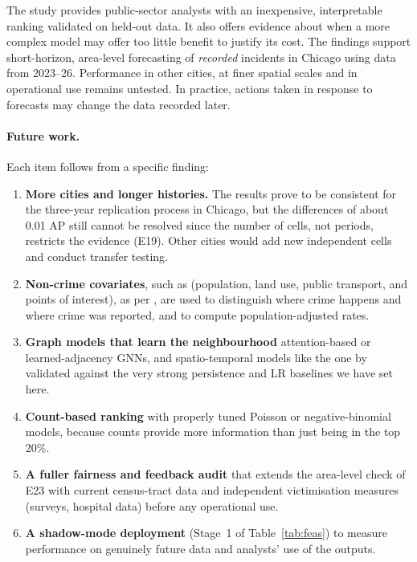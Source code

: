 \documentclass[11pt,a4paper]{report}
\begin{document}
The study provides public-sector analysts with an inexpensive, interpretable ranking validated on held-out data. It also offers evidence about when a more complex model may offer too little benefit to justify its cost. The findings support short-horizon, area-level forecasting of \emph{recorded} incidents in Chicago using data from 2023--26. Performance in other cities, at finer spatial scales and in operational use remains untested. In practice, actions taken in response to forecasts may change the data recorded later.


\paragraph{Future work.} Each item follows from a specific finding:
\begin{enumerate}
\item \textbf{More cities and longer histories.} The results prove to be consistent for the three-year replication process in Chicago, but the differences of about 0.01 AP still cannot be resolved since the number of cells, not periods, restricts the evidence (E19). Other cities would add new independent cells and conduct transfer testing.
\item \textbf{Non-crime covariates}, such as (population, land use, public transport, and points of interest), as per \citet{zhang2020}, are used to distinguish where crime happens and where crime was reported, and to compute population-adjusted rates.
\item \textbf{Graph models that learn the neighbourhood} attention-based or learned-adjacency GNNs, and spatio-temporal models like the one by \citet{han2020} validated against the very strong persistence and LR baselines we have set here.
\item \textbf{Count-based ranking} with properly tuned Poisson or negative-binomial models, because counts provide more information than just being in the top 20\%.
\item \textbf{A fuller fairness and feedback audit} that extends the area-level check of E23 with current census-tract data and independent victimisation measures (surveys, hospital data) before any operational use.
\item \textbf{A shadow-mode deployment} (Stage~1 of Table~\ref{tab:feas}) to measure performance on genuinely future data and analysts' use of the outputs.
\end{enumerate}

\clearpage
{}
{}


\end{document}
